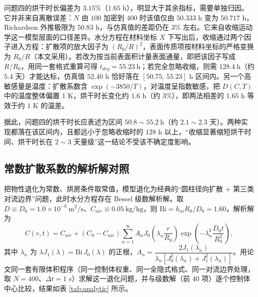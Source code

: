 \documentclass[12pt,a4paper]{article}
\begin{document}
问题四的烘干时长偏差为 $3.15\%$（$1.65$ h），明显大于其余指标，需要单独归因。它并非来自离散误差：$N$ 由 $100$ 加密到 $400$ 时该值仅由 $50.333$ h 变为 $50.717$ h，Richardson 外推极限为 $50.83$ h，与仿真值的差距仍在 $3\%$ 左右。它来自收缩运动学这一模型层面的口径差异。水分方程在材料坐标 $X$ 下写出后，收缩通过两个因子进入方程：扩散项的放大因子为 $(R_0/R)^2$，表面传质项按材料坐标的严格变换为 $R_0/R$（本文采用）。若改为按当前表面积计量表面通量，即把该因子写成 $R/R_0$，用同一套格式重算可得 $t_{dry}=55.23\ \mathrm{h}$；若完全忽略收缩，则需 $128.4\ \mathrm{h}$（约 $5.4$ 天）才能达标，仿真值 $52.40$ h 恰好落在 $[50.75,\,55.23]$ h 区间内。另一个高敏感量是温度：扩散系数含 $\exp(-3850/T)$，对温度呈指数敏感，把 $D(C,T)$ 中的温度整体偏置 $1$ K，烘干时长变化约 $1.6$ h（约 $3\%$），即两法相差的 $1.65$ h 等效于约 $1$ K 的温差。

据此，问题四的烘干时长应表述为区间 $50.8\sim55.2\ \mathrm{h}$（约 $2.1\sim2.3$ 天）。两种实现都落在该区间内，且都远小于忽略收缩时的 $128$ h 以上，“收缩显著缩短烘干时间、烘干时长在 $2\sim3$ 天量级”这一结论不受该不确定度影响。

\subsection{常数扩散系数的解析解对照}
\label{sec:analytic}

把物性退化为常数、烘房条件取常值，模型退化为经典的“圆柱径向扩散 $+$ 第三类对流边界”问题，此时水分方程存在 Bessel 级数解析解。取 $D\equiv D_0=1.0\times10^{-8}\ \mathrm{m^2/s}$、$C_{air}\equiv0.05\ \mathrm{kg/kg}$，则 $\mathrm{Bi}=h_mR_0/D_0=1.60$，解析解为
\begin{equation}
C(r,t)=C_{air}+\left(C_0-C_{air}\right)\sum_{n=1}^{\infty}A_nJ_0\!\left(\lambda_n\frac{r}{R_0}\right)\exp\!\left(-\lambda_n^{2}\frac{D_0t}{R_0^{2}}\right),
\end{equation}
其中 $\lambda_n$ 为 $\lambda J_1(\lambda)=\mathrm{Bi}\,J_0(\lambda)$ 的正根，$A_n=\dfrac{2J_1(\lambda_n)}{\lambda_n\left[J_0^{2}(\lambda_n)+J_1^{2}(\lambda_n)\right]}$。用论文同一套有限体积程序（同一控制体权重、同一全隐式格式、同一对流边界处理，取 $N=400$、$\Delta t=1$ s）求解这一退化问题，并与级数解（前 $40$ 项）逐个控制体中心比较，结果如表 \ref{tab:analytic} 所示。
\end{document}
